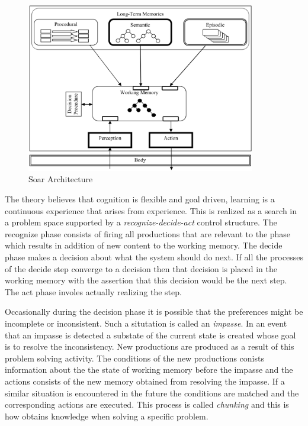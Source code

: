 \begin{figure}[htp]
  \centering
  \includegraphics[width=100mm]{soar.eps}
  \caption{Soar Architecture\cite{Jill-Fain-Lehman:2006aa}}
  \label{SOAR_ARCH}
\end{figure}

The \soar theory believes that cognition is flexible and goal driven,
learning is a continuous experience that arises from experience. This
is realized as a search in a problem space supported by a
\emph{recognize-decide-act} control structure\cite{Lewis:2001aa}. The
recognize phase consists of firing all productions that are relevant
to the phase which results in addition of new content to the working
memory. The decide phase makes a decision about what the system should
do next. If all the processes of the decide step converge to a
decision then that decision is placed in the working memory with the
assertion that this decision would be the next step. The act phase
involes actually realizing the step. 
 
Occasionally during the decision phase it is possible that the
preferences might be incomplete or inconsistent. Such a situtation is
called an \emph{impasse}. In an event that an impasse is detected a
substate of the current state is created whose goal is to resolve the
inconsistency. New productions are produced as a result of this
problem solving activity. The conditions of the new productions
conists information about the the state of working memory before the
impasse and the actions consists of the new memory obtained from
resolving the impasse. If a similar situation is encountered in the
future the conditions are matched and the corresponding actions are
executed.  This process is called \emph{chunking} and this is how
\soar obtains knowledge when solving a specific problem.

